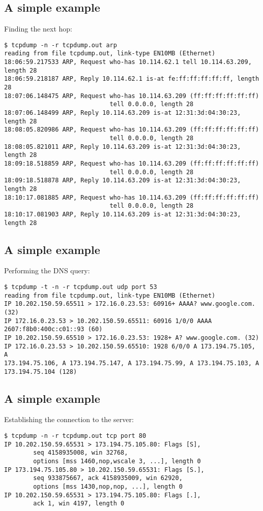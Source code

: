 \documentclass[xga]{xdvislides}
\begin{document}
\subsection{A simple example}
Finding the next hop:
\begin{verbatim}
$ tcpdump -n -r tcpdump.out arp
reading from file tcpdump.out, link-type EN10MB (Ethernet)
18:06:59.217533 ARP, Request who-has 10.114.62.1 tell 10.114.63.209, length 28
18:06:59.218187 ARP, Reply 10.114.62.1 is-at fe:ff:ff:ff:ff:ff, length 28
18:07:06.148475 ARP, Request who-has 10.114.63.209 (ff:ff:ff:ff:ff:ff)
                             tell 0.0.0.0, length 28
18:07:06.148499 ARP, Reply 10.114.63.209 is-at 12:31:3d:04:30:23, length 28
18:08:05.820986 ARP, Request who-has 10.114.63.209 (ff:ff:ff:ff:ff:ff)
                             tell 0.0.0.0, length 28
18:08:05.821011 ARP, Reply 10.114.63.209 is-at 12:31:3d:04:30:23, length 28
18:09:18.518859 ARP, Request who-has 10.114.63.209 (ff:ff:ff:ff:ff:ff)
                             tell 0.0.0.0, length 28
18:09:18.518878 ARP, Reply 10.114.63.209 is-at 12:31:3d:04:30:23, length 28
18:10:17.081885 ARP, Request who-has 10.114.63.209 (ff:ff:ff:ff:ff:ff)
                             tell 0.0.0.0, length 28
18:10:17.081903 ARP, Reply 10.114.63.209 is-at 12:31:3d:04:30:23, length 28
\end{verbatim}

\subsection{A simple example}
Performing the DNS query:
\begin{verbatim}
$ tcpdump -t -n -r tcpdump.out udp port 53
reading from file tcpdump.out, link-type EN10MB (Ethernet)
IP 10.202.150.59.65511 > 172.16.0.23.53: 60916+ AAAA? www.google.com. (32)
IP 172.16.0.23.53 > 10.202.150.59.65511: 60916 1/0/0 AAAA 2607:f8b0:400c:c01::93 (60)
IP 10.202.150.59.65510 > 172.16.0.23.53: 1928+ A? www.google.com. (32)
IP 172.16.0.23.53 > 10.202.150.59.65510: 1928 6/0/0 A 173.194.75.105, A
173.194.75.106, A 173.194.75.147, A 173.194.75.99, A 173.194.75.103, A 173.194.75.104 (128)
\end{verbatim}

\subsection{A simple example}
Establishing the connection to the server:
\begin{verbatim}
$ tcpdump -n -r tcpdump.out tcp port 80
IP 10.202.150.59.65531 > 173.194.75.105.80: Flags [S],
        seq 4158935008, win 32768,
        options [mss 1460,nop,wscale 3, ...], length 0
IP 173.194.75.105.80 > 10.202.150.59.65531: Flags [S.],
        seq 933875667, ack 4158935009, win 62920,
        options [mss 1430,nop,nop, ...], length 0
IP 10.202.150.59.65531 > 173.194.75.105.80: Flags [.],
        ack 1, win 4197, length 0
\end{verbatim}
\end{document}
